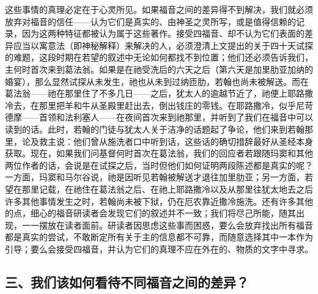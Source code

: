 这些事情的真理必定在于心灵所见。如果福音之间的差异得不到解决，我们就必须放弃对福音的信任——认为它们是真实的、由神圣之灵所写，或是值得信赖的记录，因为这两种特征都被认为属于这些著作。接受四福音、却不认为它们表面的差异应当以寓意法（即神秘解释）来解决的人，必须澄清上文提出的关于四十天试探的难题，这段时期在若望的叙述中无论如何都找不到位置；他们还必须告诉我们，主何时首次来到葛法翁。如果是在祂受洗后的六天之后（第六天是加里肋亚加纳的婚宴），那么显然试探从未发生，祂也从未到过纳匝肋，若翰也尚未被解送。而在葛法翁——祂在那里住了不多几日——之后，犹太人的逾越节近了，祂便上耶路撒冷去，在那里把羊和牛从圣殿里赶出去，倒出钱庄的零钱。在耶路撒冷，似乎尼苛德摩——首领和法利塞人——在夜间首次来到祂那里，并听到了我们在福音中可以读到的话。此时，若翰的门徒与犹太人关于洁净的话题起了争论，他们来到若翰那里，论及救主说：他们曾从施洗者口中听到话，这些话的确切措辞最好从圣经本身获取。现在，如果我们问基督何时首次在葛法翁，我们的回应者若跟随玛窦和其他两位作者的话，会说是在试探之后，当时但他们如何证明两段陈述都是真实的呢？一方面，玛窦和马尔谷说，祂是因听见若翰被解送才退往加里肋亚；另一方面，若望在那里记载，在祂住在葛法翁之后、在祂上耶路撒冷以及从那里往犹太地去之后许多其他事情发生之时，若翰尚未被下狱，仍在厄农靠近撒冷施洗。还有许多其他的点，细心的福音研读者会发现它们的叙述并不一致；我们将尽己所能，随其出现，一一摆放在读者面前。研读者因思虑这些事而困惑，要么会放弃找出所有福音都是真实的尝试，不敢断定所有关于主的信息都不可靠，而随意选择其中一本作为引导；要么会接受四福音，并认为它们的真理不应在外在的、物质的文字中寻求。\par


\subsection{三、我们该如何看待不同福音之间的差异？}

